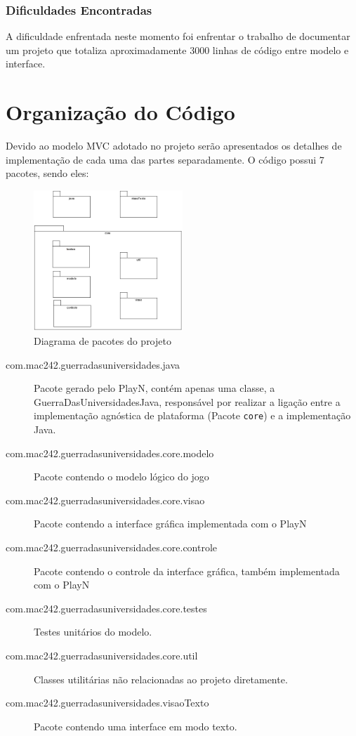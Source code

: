 \documentclass[brazil,times]{abnt}
\begin{document}
\subsection{Dificuldades Encontradas}
A dificuldade enfrentada neste momento foi enfrentar o trabalho de documentar um
projeto que totaliza aproximadamente 3000 linhas de código entre modelo e
interface.


\chapter{Organização do Código}
Devido ao modelo MVC adotado no projeto serão apresentados os detalhes de
implementação de cada uma das partes separadamente. O código possui 7 pacotes,
sendo eles: 

\begin{figure}[htp]
\begin{center}
  \includegraphics[width=0.5\textwidth]{imagens/Pacotes.png}
  \caption[Diagrama de pacotes do projeto]{Diagrama de pacotes do projeto}
  \label{diagrama-pacotes}
\end{center}
\end{figure}


\begin{description}
  \item[com.mac242.guerradasuniversidades.java] Pacote gerado pelo PlayN, contém
  apenas uma classe, a GuerraDasUniversidadesJava, responsável por realizar a
  ligação entre a implementação agnóstica de plataforma (Pacote \texttt{core}) e
  a implementação Java.
  \item[com.mac242.guerradasuniversidades.core.modelo] Pacote contendo o
  modelo lógico do jogo
  \item[com.mac242.guerradasuniversidades.core.visao] Pacote contendo a
  interface gráfica implementada com o PlayN
  \item[com.mac242.guerradasuniversidades.core.controle] Pacote contendo o
  controle da interface gráfica, também implementada com o PlayN
  \item[com.mac242.guerradasuniversidades.core.testes] Testes unitários do
  modelo.
  \item[com.mac242.guerradasuniversidades.core.util] Classes utilitárias
  não relacionadas ao projeto diretamente.
  \item[com.mac242.guerradasuniversidades.visaoTexto] Pacote contendo uma
  interface em modo texto.
\end{description}
\end{document}
